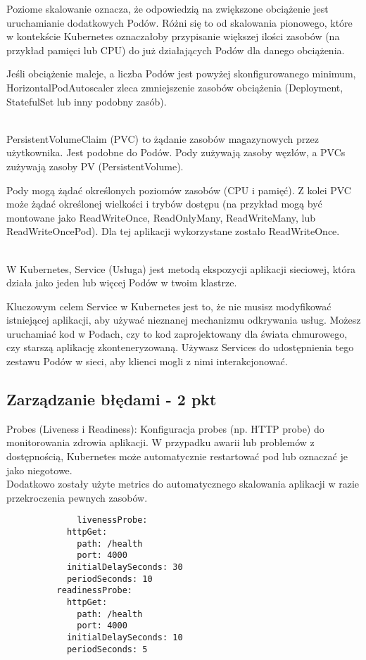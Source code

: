 \documentclass[12pt,a4paper]{article}
\begin{document}
Poziome skalowanie oznacza, że odpowiedzią na zwiększone obciążenie jest uruchamianie dodatkowych Podów. Różni się to od skalowania pionowego, które w kontekście Kubernetes oznaczałoby przypisanie większej ilości zasobów (na przykład pamięci lub CPU) do już działających Podów dla danego obciążenia.

Jeśli obciążenie maleje, a liczba Podów jest powyżej skonfigurowanego minimum, HorizontalPodAutoscaler zleca zmniejszenie zasobów obciążenia (Deployment, StatefulSet lub inny podobny zasób).

\\
PersistentVolumeClaim (PVC) to żądanie zasobów magazynowych przez użytkownika. Jest podobne do Podów. Pody zużywają zasoby węzłów, a PVCs zużywają zasoby PV (PersistentVolume).

Pody mogą żądać określonych poziomów zasobów (CPU i pamięć). Z kolei PVC może żądać określonej wielkości i trybów dostępu (na przykład mogą być montowane jako ReadWriteOnce, ReadOnlyMany, ReadWriteMany, lub ReadWriteOncePod). Dla tej aplikacji wykorzystane zostało ReadWriteOnce.

\\

W Kubernetes, Service (Usługa) jest metodą ekspozycji aplikacji sieciowej, która działa jako jeden lub więcej Podów w twoim klastrze.

Kluczowym celem Service w Kubernetes jest to, że nie musisz modyfikować istniejącej aplikacji, aby używać nieznanej mechanizmu odkrywania usług. Możesz uruchamiać kod w Podach, czy to kod zaprojektowany dla świata chmurowego, czy starszą aplikację zkonteneryzowaną. Używasz Services do udostępnienia tego zestawu Podów w sieci, aby klienci mogli z nimi interakcjonować.
\subsection{Zarządzanie błędami - 2 pkt}
\label{sec:ERD} 

Probes (Liveness i Readiness): Konfiguracja probes (np. HTTP probe) do monitorowania zdrowia aplikacji. W przypadku awarii lub problemów z dostępnością, Kubernetes może automatycznie restartować pod lub oznaczać je jako niegotowe.
\\
Dodatkowo zostały użyte metrics do automatycznego skalowania aplikacji w razie przekroczenia pewnych zasobów.

\begin{verbatim}
              livenessProbe:
            httpGet:
              path: /health
              port: 4000
            initialDelaySeconds: 30
            periodSeconds: 10
          readinessProbe:
            httpGet:
              path: /health
              port: 4000
            initialDelaySeconds: 10
            periodSeconds: 5
\end{verbatim}
\end{document}
